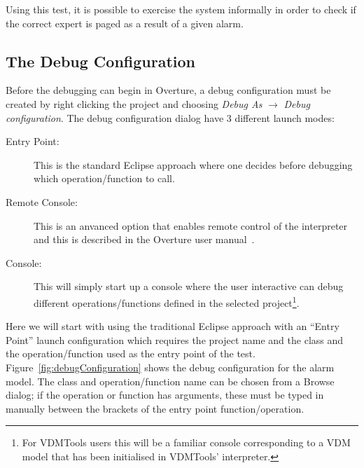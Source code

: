 Using this test, it is possible to exercise the system informally in
order to check if the correct expert is paged as a result of a given
alarm.


\subsection{The Debug Configuration}\label{sec:debugconfig}

Before the debugging can begin in Overture, a debug configuration must
be created by right clicking the project and choosing \emph{Debug As}
$ \rightarrow $ \emph{Debug configuration}.
The debug configuration
dialog have 3 different launch modes:

\begin{description}
\item[Entry Point:] This is the standard Eclipse approach where one
  decides before debugging which operation/function to call.
\item[Remote Console:] This is an anvanced option that enables remote
  control of the interpreter and this is described in the Overture
  user manual~\cite{Larsen&10d}.
\item[Console:] This will simply start up a console where the user
  interactive can debug different operations/functions defined in the
  selected project\footnote{For VDMTools users this will be a familiar
    console corresponding to a VDM model that has been initialised in
    VDMTools' interpreter.}.
\end{description}

Here we will start with using
the traditional Eclipse approach with an ``Entry Point'' launch
configuration which requires the project name and the class and the operation/function
used as the entry point of the test.  Figure~\ref{fig:debugConfiguration}
shows the debug configuration for the alarm model. The class and
operation/function name can be chosen from a Browse dialog; if the
operation or function has arguments, these must be typed in manually
between the brackets of the entry point
function/operation.

